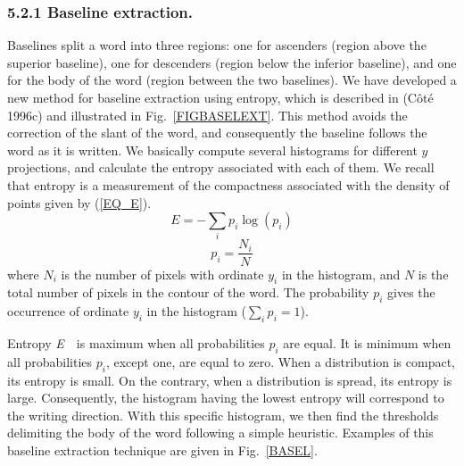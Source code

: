 \documentclass[ijdar]{svjour}
\begin{document}
\subsubsection{5.2.1 Baseline extraction.}

Baselines split a word into three regions: one for ascenders (region above the superior baseline), one for descenders (region below the inferior baseline), and one for the body of the word (region between the two baselines).
We have developed a new method for baseline extraction using entropy, which is described in (C\^ot\'e 1996c) and illustrated in Fig.~\ref{FIGBASELEXT}.
This method avoids the correction of the slant of the word, and consequently the baseline follows the word as it is written.
We basically compute several histograms for different $y$ projections, and calculate the entropy associated with each of them.
We recall that entropy is a measurement of the compactness associated with the density of points given by
(\ref{EQ_E}).
%
\begin{equation}
E = -\sum_{i}p_{i} \log(p_{i})
\label{EQ_E}
\end{equation}
\begin{equation}
p_{i} = \frac{N_{i}}{N}
\label{EQ_P}
\end{equation}
%
where $N_{i}$ is the number of pixels with ordinate $y_{i}$ in the histogram, and $N$ is the total number of pixels in the contour of the word.
The probability $p_{i}$ gives the occurrence of ordinate $y_{i}$ in the histogram ($\sum_{i}p_{i} = 1$).

Entropy {\it E}~~is maximum when all probabilities $p_{i}$ are equal.
It is minimum when all probabilities $p_{i}$, except one, are equal to zero.
When a distribution is compact, its entropy is small.
On the contrary, when a distribution is spread, its entropy is large.
Consequently, the histogram having the lowest entropy will correspond to the writing direction.
With this specific histogram, we then find the thresholds delimiting the body of the word following a simple heuristic.
Examples of this baseline extraction technique are given in Fig.~\ref{BASEL}.
\end{document}
